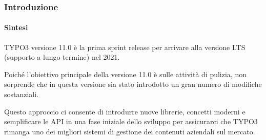%

\begin{frame}[fragile]
	\frametitle{Introduzione}
	\framesubtitle{Sintesi}

	\small
		TYPO3 versione 11.0 è la prima sprint release per arrivare alla versione LTS
		(supporto a lungo termine) nel 2021.

		\vspace{0.2cm}

		Poiché l'obiettivo principale della versione 11.0 è sulle attività di pulizia,
        non sorprende che in questa versione sia stato introdotto un gran numero
        di modifiche sostanziali.

		\vspace{0.2cm}

		Questo approccio ci consente di introdurre nuove librerie, concetti moderni e
		semplificare le API in una fase iniziale dello sviluppo per assicurarci che
		TYPO3 rimanga uno dei migliori sistemi di gestione dei contenuti aziendali
		sul mercato.

		\vspace{0.2cm}

	\normalsize

\end{frame}

